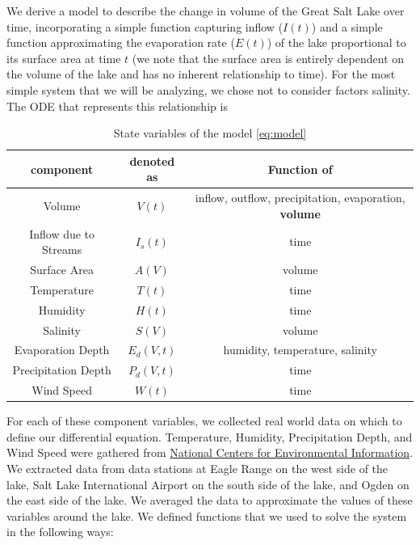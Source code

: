 \documentclass[12pt]{article}
\begin{document}
We derive a model to describe the change in volume of the Great Salt Lake over time, incorporating a simple function capturing inflow ($I(t)$) and a simple function approximating the evaporation rate ($E(t)$) of the lake proportional to its surface area at time $t$ (we note that the surface area is entirely dependent on the volume of the lake and has no inherent relationship to time). For the most simple system that we will be analyzing, we chose not to consider factors salinity. The ODE that represents this relationship is

\begin{table}[h!]
    \centering 
    \begin{tabular}{|c|c|c|}
    \hline
        component & denoted as & Function of \\\hline\hline
        Volume & $V(t)$ & inflow, outflow, precipitation, evaporation, \textbf{volume}  \\\hline
        Inflow due to Streams & $I_s(t)$ & time\\\hline
        Surface Area & $A(V)$ & volume \\\hline
        Temperature & $T(t)$ & time\\\hline
        Humidity & $H(t)$ & time \\\hline
        Salinity & $S(V)$ & volume \\\hline
        Evaporation Depth & $E_d(V, t)$ & humidity, temperature, salinity \\\hline
        Precipitation Depth & $P_d(V, t)$ & time \\\hline
        Wind Speed & $W(t)$ & time \\\hline
    \end{tabular}
    \caption{State variables of the model \eqref{eq:model}}
\end{table}

For each of these component variables, we collected real world data on which to define our differential equation. Temperature, Humidity, Precipitation Depth, and Wind Speed were gathered from \href{https://www.ncei.noaa.gov/access/search/data-search/global-summary-of-the-day}{National Centers for Environmental Information}. We extracted data from data stations at Eagle Range on the west side of the lake, Salt Lake International Airport on the south side of the lake, and Ogden on the east side of the lake. We averaged the data to approximate the values of these variables around the lake. We defined functions that we used to solve the system in the following ways:
\end{document}
